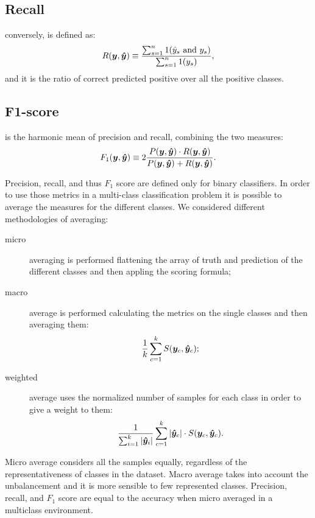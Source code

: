 \subsection{Recall} conversely, is defined as:
\begin{equation}\label{eq:recall}
R(\bm{y}, \bm{\hat y}) \equiv \frac{\sum_{s=1}^n 1(\hat
  y_s \text{ and }y_s)}{\sum_{s=1}^n 1(y_s)},
\end{equation}
and it is the ratio of correct predicted positive over all the positive
classes.

\subsection{F1-score} is the harmonic mean of precision and recall,
combining the two measures:
\begin{equation*}
F_1(\bm{y}, \bm{\hat y}) \equiv 
2\frac{P(\bm{y}, \bm{\hat y})\cdot R(\bm{y}, \bm{\hat y})}
{P(\bm{y}, \bm{\hat y})+R(\bm{y}, \bm{\hat y})}.
\end{equation*}

Precision, recall, and thus $F_1$ score are defined only for binary
classifiers. In order to use those metrics in a multi-class
classification problem it is possible to average the measures for the
different classes. We considered different methodologies of averaging:
\begin{description}
  \item[micro] averaging is performed flattening the array of truth
    and prediction of the different classes and then appling the
    scoring formula;
  \item[macro] average is performed calculating the metrics on the
    single classes and then averaging them:
    \begin{equation*}
      \frac{1}{k}\sum_{c=1}^k S(\bm{y}_c, \bm{\hat y}_c);
    \end{equation*}
  \item[weighted] average uses the normalized number of samples for
    each class in order to give a weight to them:
    \begin{equation*}
      \frac{1}{\sum_{i=1}^k|\bm{\hat y}_i|}\sum_{c=1}^k|\bm{\hat y}_c|\cdot S(\bm{y}_c, \bm{\hat y}_c).
    \end{equation*}
\end{description}

Micro average considers all the samples equally, regardless of the
representativeness of classes in the dataset. Macro average takes
into account the unbalancement and it is more sensible to few
represented classes. Precision, recall, and $F_1$ score are
equal to the accuracy when micro averaged in a multiclass
environment. 

